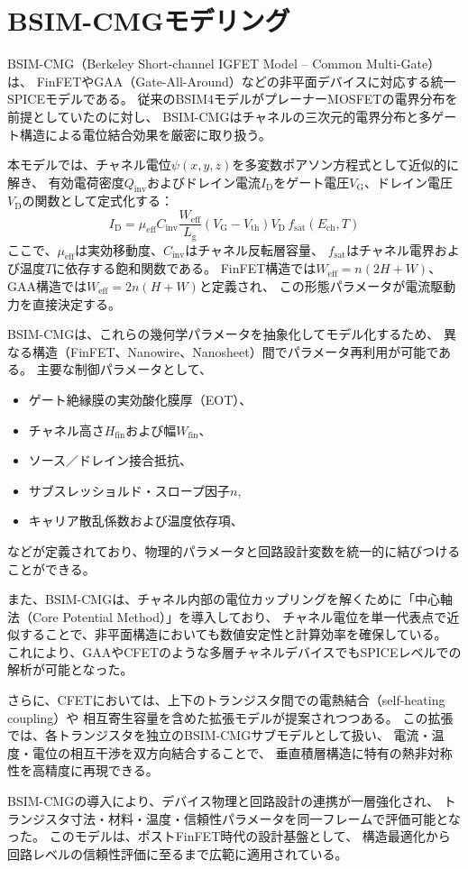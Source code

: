\section{BSIM-CMGモデリング}
BSIM-CMG（Berkeley Short-channel IGFET Model – Common Multi-Gate）は、  
FinFETやGAA（Gate-All-Around）などの非平面デバイスに対応する統一SPICEモデルである。  
従来のBSIM4モデルがプレーナーMOSFETの電界分布を前提としていたのに対し、  
BSIM-CMGはチャネルの三次元的電界分布と多ゲート構造による電位結合効果を厳密に取り扱う。

本モデルでは、チャネル電位$\psi(x,y,z)$を多変数ポアソン方程式として近似的に解き、  
有効電荷密度$Q_\text{inv}$およびドレイン電流$I_\text{D}$をゲート電圧$V_\text{G}$、ドレイン電圧$V_\text{D}$の関数として定式化する：  
\begin{equation}
I_\text{D} = \mu_\text{eff} C_\text{inv} \frac{W_\text{eff}}{L_\text{g}} (V_\text{G} - V_\text{th}) V_\text{D} \, f_\text{sat}(E_\text{ch},T)
\end{equation}
ここで、$\mu_\text{eff}$は実効移動度、$C_\text{inv}$はチャネル反転層容量、  
$f_\text{sat}$はチャネル電界および温度$T$に依存する飽和関数である。  
FinFET構造では$W_\text{eff}=n(2H+W)$、GAA構造では$W_\text{eff}=2n(H+W)$と定義され、  
この形態パラメータが電流駆動力を直接決定する。

BSIM-CMGは、これらの幾何学パラメータを抽象化してモデル化するため、  
異なる構造（FinFET、Nanowire、Nanosheet）間でパラメータ再利用が可能である。  
主要な制御パラメータとして、  
\begin{itemize}
    \item ゲート絶縁膜の実効酸化膜厚（EOT）、  
    \item チャネル高さ$H_\text{fin}$および幅$W_\text{fin}$、  
    \item ソース／ドレイン接合抵抗、  
    \item サブスレッショルド・スロープ因子$n$,  
    \item キャリア散乱係数および温度依存項、  
\end{itemize}
などが定義されており、物理的パラメータと回路設計変数を統一的に結びつけることができる。

また、BSIM-CMGは、チャネル内部の電位カップリングを解くために「中心軸法（Core Potential Method）」を導入しており、  
チャネル電位を単一代表点で近似することで、非平面構造においても数値安定性と計算効率を確保している。  
これにより、GAAやCFETのような多層チャネルデバイスでもSPICEレベルでの解析が可能となった。

さらに、CFETにおいては、上下のトランジスタ間での電熱結合（self-heating coupling）や  
相互寄生容量を含めた拡張モデルが提案されつつある。  
この拡張では、各トランジスタを独立のBSIM-CMGサブモデルとして扱い、  
電流・温度・電位の相互干渉を双方向結合することで、  
垂直積層構造に特有の熱非対称性を高精度に再現できる。

BSIM-CMGの導入により、デバイス物理と回路設計の連携が一層強化され、  
トランジスタ寸法・材料・温度・信頼性パラメータを同一フレームで評価可能となった。  
このモデルは、ポストFinFET時代の設計基盤として、  
構造最適化から回路レベルの信頼性評価に至るまで広範に適用されている。
